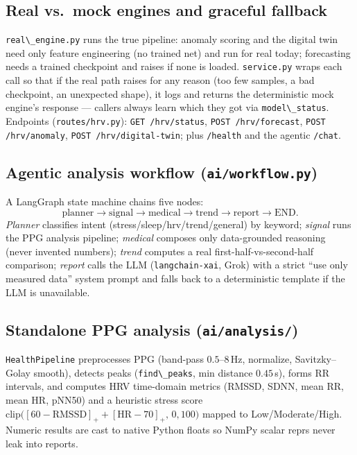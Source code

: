 \documentclass[11pt,a4paper]{article}
\newcommand{\code}[1]{\lstinline[basicstyle=\ttfamily\normalsize]!#1!}
\begin{document}
\subsection{Real vs.\ mock engines and graceful fallback}
\code{real\_engine.py} runs the true pipeline: anomaly scoring and the digital
twin need only feature engineering (no trained net) and run for real today;
forecasting needs a trained checkpoint and raises if none is loaded.
\code{service.py} wraps each call so that if the real path raises for any reason
(too few samples, a bad checkpoint, an unexpected shape), it logs and returns the
deterministic mock engine's response --- callers always learn which they got via
\code{model\_status}. Endpoints (\code{routes/hrv.py}):
\code{GET /hrv/status}, \code{POST /hrv/forecast}, \code{POST /hrv/anomaly},
\code{POST /hrv/digital-twin}; plus \code{/health} and the agentic \code{/chat}.

\subsection{Agentic analysis workflow (\texttt{ai/workflow.py})}
A LangGraph state machine chains five nodes:
\[
\text{planner}\to\text{signal}\to\text{medical}\to\text{trend}\to\text{report}\to\text{END}.
\]
\emph{Planner} classifies intent (stress/sleep/hrv/trend/general) by keyword;
\emph{signal} runs the PPG analysis pipeline; \emph{medical} composes only
data-grounded reasoning (never invented numbers); \emph{trend} computes a real
first-half-vs-second-half comparison; \emph{report} calls the LLM
(\code{langchain-xai}, Grok) with a strict ``use only measured data'' system
prompt and falls back to a deterministic template if the LLM is unavailable.

\subsection{Standalone PPG analysis (\texttt{ai/analysis/})}
\code{HealthPipeline} preprocesses PPG (band-pass $0.5$--$8$\,Hz, normalize,
Savitzky--Golay smooth), detects peaks (\code{find\_peaks}, min distance
$0.45\,$s), forms RR intervals, and computes HRV time-domain metrics
(RMSSD, SDNN, mean RR, mean HR, pNN50) and a heuristic stress score
$\text{clip}\big([60-\text{RMSSD}]_+ + [\text{HR}-70]_+,\,0,100\big)$ mapped to
Low/Moderate/High. Numeric results are cast to native Python floats so NumPy
scalar reprs never leak into reports.

\end{document}

